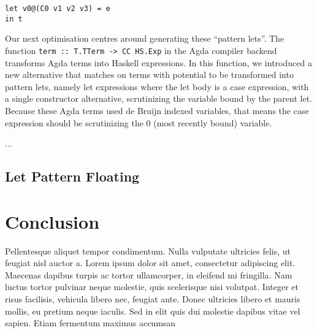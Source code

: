 \begin{lstlisting}
let v0@(C0 v1 v2 v3) = e
in t
\end{lstlisting}

Our next optimisation centres around generating these ``pattern lets''. The function \lstinline{term :: T.TTerm -> CC HS.Exp} in the Agda compiler backend transforms Agda terms into Haskell expressions. In this function, we introduced a new alternative that matches on terms with potential to be transformed into pattern lets, namely let expressions where the let body is a case expression, with a single constructor alternative, scrutinizing the variable bound by the parent let. Because these Agda terms used de Bruijn indexed variables, that means the case expression should be scrutinizing the 0 (most recently bound) variable.

...

\subsection{Let Pattern Floating}

\section{Conclusion}
\label{sec:main_conclusion}

Pellentesque aliquet tempor condimentum. Nulla vulputate ultricies felis, ut feugiat nisl auctor a. Lorem ipsum dolor sit amet, consectetur adipiscing elit. Maecenas dapibus turpis ac tortor ullamcorper, in eleifend mi fringilla. Nam luctus tortor pulvinar neque molestie, quis scelerisque nisi volutpat. Integer et risus facilisis, vehicula libero nec, feugiat ante. Donec ultricies libero et mauris mollis, eu pretium neque iaculis. Sed in elit quis dui molestie dapibus vitae vel sapien. Etiam fermentum maximus accumsan

